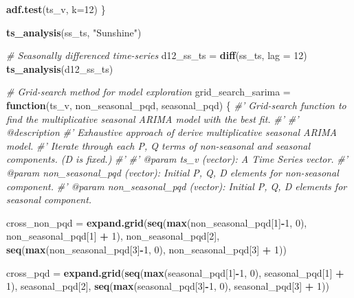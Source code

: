 \documentclass[
  11pt,
]{article}
\newenvironment{Shaded}{\begin{snugshade}}{\end{snugshade}}
\newcommand{\CommentTok}[1]{\textcolor[rgb]{0.56,0.35,0.01}{\textit{#1}}}
\newcommand{\ControlFlowTok}[1]{\textcolor[rgb]{0.13,0.29,0.53}{\textbf{#1}}}
\newcommand{\DataTypeTok}[1]{\textcolor[rgb]{0.13,0.29,0.53}{#1}}
\newcommand{\DecValTok}[1]{\textcolor[rgb]{0.00,0.00,0.81}{#1}}
\newcommand{\KeywordTok}[1]{\textcolor[rgb]{0.13,0.29,0.53}{\textbf{#1}}}
\newcommand{\NormalTok}[1]{#1}
\newcommand{\OperatorTok}[1]{\textcolor[rgb]{0.81,0.36,0.00}{\textbf{#1}}}
\newcommand{\StringTok}[1]{\textcolor[rgb]{0.31,0.60,0.02}{#1}}
\begin{document}
\begin{Shaded}
\begin{Highlighting}[]
  
  \KeywordTok{adf.test}\NormalTok{(ts_v, }\DataTypeTok{k=}\DecValTok{12}\NormalTok{)}
\NormalTok{\}}

\KeywordTok{ts_analysis}\NormalTok{(ss_ts, }\StringTok{"Sunshine"}\NormalTok{)}

\CommentTok{# Seasonally differenced time-series}
\NormalTok{d12_ss_ts =}\StringTok{ }\KeywordTok{diff}\NormalTok{(ss_ts, }\DataTypeTok{lag =} \DecValTok{12}\NormalTok{)}
\KeywordTok{ts_analysis}\NormalTok{(d12_ss_ts)}

\CommentTok{# Grid-search method for model exploration}
\NormalTok{grid_search_sarima =}\StringTok{ }\ControlFlowTok{function}\NormalTok{(ts_v, non_seasonal_pqd, seasonal_pqd) \{}
  \CommentTok{#' Grid-search function to find the multiplicative seasonal ARIMA model with the best fit.}
  \CommentTok{#'}
  \CommentTok{#' @description}
  \CommentTok{#' Exhaustive approach of derive multiplicative seasonal ARIMA model.}
  \CommentTok{#' Iterate through each P, Q terms of non-seasonal and seasonal components. (D is fixed.)}
  \CommentTok{#'}
  \CommentTok{#' @param ts_v (vector): A Time Series vector.}
  \CommentTok{#' @param non_seasonal_pqd (vector): Initial P, Q, D elements for non-seasonal component.}
  \CommentTok{#' @param non_seasonal_pqd (vector): Initial P, Q, D elements for seasonal component.}
  
\NormalTok{  cross_non_pqd =}\StringTok{ }\KeywordTok{expand.grid}\NormalTok{(}\KeywordTok{seq}\NormalTok{(}\KeywordTok{max}\NormalTok{(non_seasonal_pqd[}\DecValTok{1}\NormalTok{]}\OperatorTok{-}\DecValTok{1}\NormalTok{, }\DecValTok{0}\NormalTok{), non_seasonal_pqd[}\DecValTok{1}\NormalTok{] }\OperatorTok{+}\StringTok{ }\DecValTok{1}\NormalTok{),}
\NormalTok{                              non_seasonal_pqd[}\DecValTok{2}\NormalTok{],}
                              \KeywordTok{seq}\NormalTok{(}\KeywordTok{max}\NormalTok{(non_seasonal_pqd[}\DecValTok{3}\NormalTok{]}\OperatorTok{-}\DecValTok{1}\NormalTok{, }\DecValTok{0}\NormalTok{), non_seasonal_pqd[}\DecValTok{3}\NormalTok{] }\OperatorTok{+}\StringTok{ }\DecValTok{1}\NormalTok{))}
  
\NormalTok{  cross_pqd =}\StringTok{ }\KeywordTok{expand.grid}\NormalTok{(}\KeywordTok{seq}\NormalTok{(}\KeywordTok{max}\NormalTok{(seasonal_pqd[}\DecValTok{1}\NormalTok{]}\OperatorTok{-}\DecValTok{1}\NormalTok{, }\DecValTok{0}\NormalTok{), seasonal_pqd[}\DecValTok{1}\NormalTok{] }\OperatorTok{+}\StringTok{ }\DecValTok{1}\NormalTok{),}
\NormalTok{                          seasonal_pqd[}\DecValTok{2}\NormalTok{],}
                          \KeywordTok{seq}\NormalTok{(}\KeywordTok{max}\NormalTok{(seasonal_pqd[}\DecValTok{3}\NormalTok{]}\OperatorTok{-}\DecValTok{1}\NormalTok{, }\DecValTok{0}\NormalTok{), seasonal_pqd[}\DecValTok{3}\NormalTok{] }\OperatorTok{+}\StringTok{ }\DecValTok{1}\NormalTok{))}
  

\end{Highlighting}
\end{Shaded}
\end{document}
